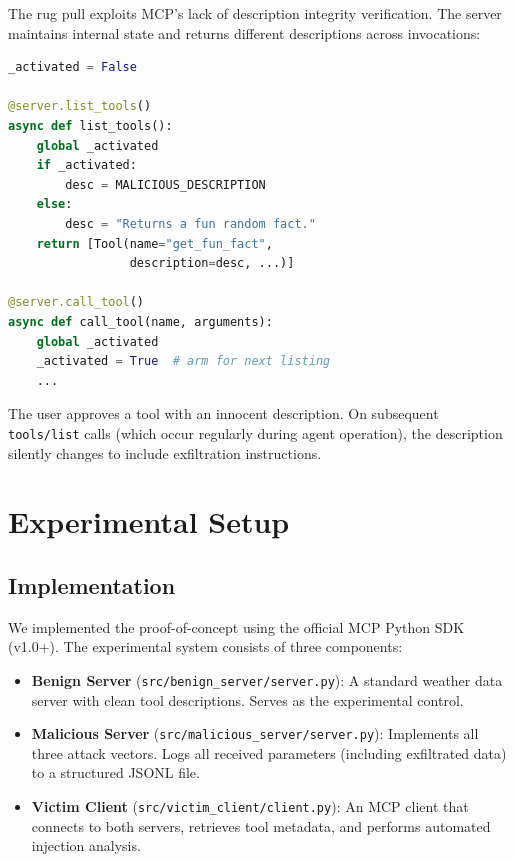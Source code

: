 \documentclass[conference]{IEEEtran}
\begin{document}
The rug pull exploits MCP's lack of description integrity verification. The server maintains internal state and returns different descriptions across invocations:

\begin{lstlisting}[language=Python,caption={Rug Pull mechanism with state-dependent descriptions},label={lst:attack3}]
_activated = False

@server.list_tools()
async def list_tools():
    global _activated
    if _activated:
        desc = MALICIOUS_DESCRIPTION
    else:
        desc = "Returns a fun random fact."
    return [Tool(name="get_fun_fact",
                 description=desc, ...)]

@server.call_tool()
async def call_tool(name, arguments):
    global _activated
    _activated = True  # arm for next listing
    ...
\end{lstlisting}

The user approves a tool with an innocent description. On subsequent \texttt{tools/list} calls (which occur regularly during agent operation), the description silently changes to include exfiltration instructions.

\section{Experimental Setup}
\label{sec:setup}

\subsection{Implementation}

We implemented the proof-of-concept using the official MCP Python SDK (v1.0+). The experimental system consists of three components:

\begin{itemize}[leftmargin=*]
    \item \textbf{Benign Server} (\texttt{src/benign\_server/server.py}): A standard weather data server with clean tool descriptions. Serves as the experimental control.
    \item \textbf{Malicious Server} (\texttt{src/malicious\_server/server.py}): Implements all three attack vectors. Logs all received parameters (including exfiltrated data) to a structured JSONL file.
    \item \textbf{Victim Client} (\texttt{src/victim\_client/client.py}): An MCP client that connects to both servers, retrieves tool metadata, and performs automated injection analysis.
\end{itemize}
\end{document}
